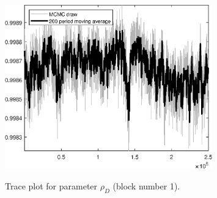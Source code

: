 \begin{figure}[H]
\centering
  \includegraphics[width=0.8\textwidth]{BRS_imp_mobility/graphs/TracePlot_rho_D_blck_1}\\
    \caption{Trace plot for parameter ${\rho_D}$ (block number 1).}
\end{figure}
